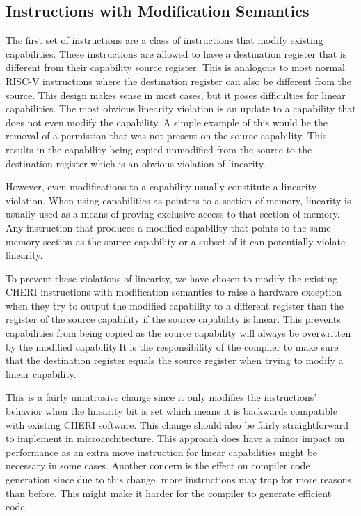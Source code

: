 \subsection{Instructions with Modification Semantics}
The first set of instructions are a class of instructions that modify existing capabilities. These instructions are allowed to have a destination register that is different from their capability source register. This is analogous to most normal RISC-V instructions where the destination register can also be different from the source. This design makes sense in most cases, but it poses difficulties for linear capabilities. The most obvious linearity violation is an update to a capability that does not even modify the capability. A simple example of this would be the removal of a permission that was not present on the source capability. This results in the capability being copied unmodified from the source to the destination register which is an obvious violation of linearity.

However, even modifications to a capability usually constitute a linearity violation. When using capabilities as pointers to a section of memory, linearity is usually used as a means of proving exclusive access to that section of memory. Any instruction that produces a modified capability that points to the same memory section as the source capability or a subset of it can potentially violate linearity.

To prevent these violations of linearity, we have chosen to modify the existing CHERI instructions with modification semantics to raise a hardware exception when they try to output the modified capability to a different register than the register of the source capability if the source capability is linear. This prevents capabilities from being copied as the source capability will always be overwritten by the modified capability.It is the responsibility of the compiler to make sure that the destination register equals the source register when trying to modify a linear capability.

This is a fairly unintrusive change since it only modifies the instructions' behavior when the linearity bit is set which means it is backwards compatible with existing CHERI software. This change should also be fairly straightforward to implement in microarchitecture. This approach does have a minor impact on performance as an extra move instruction for linear capabilities might be necessary in some cases. Another concern is the effect on compiler code generation since due to this change, more instructions may trap for more reasons than before. This might make it harder for the compiler to generate efficient code.

